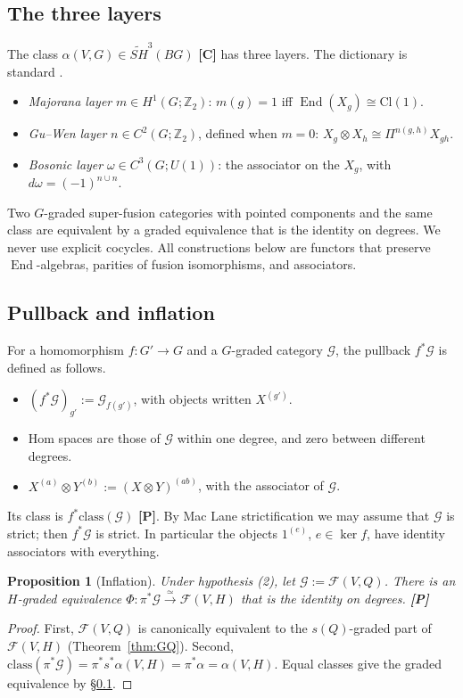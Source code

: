 \documentclass[11pt]{article}
\newtheorem{proposition}[theorem]{Proposition}
\theoremstyle{definition}
\newcommand{\cF}{\mathcal F}
\newcommand{\cG}{\mathcal G}
\newcommand{\End}{\operatorname{End}}
\newcommand{\SH}{\widetilde{SH}}
\newcommand{\Z}{\mathbb Z}
\newcommand{\st}[1]{\textbf{[#1]}}
\begin{document}
\subsection{The three layers}\label{ssec:layers}
The class $\alpha(V,G)\in\SH^3(BG)$ \cite[Thm~4.2]{GJF} \st{C} has three layers. The
dictionary is standard \cite{GJF,BGK}.
\begin{itemize}[nosep]
\item \emph{Majorana layer} $m\in H^1(G;\Z_2)$: $m(g)=1$ iff $\End(X_g)\cong\mathrm{Cl}(1)$.
\item \emph{Gu--Wen layer} $n\in C^2(G;\Z_2)$, defined when $m=0$:
$X_g\otimes X_h\cong\Pi^{n(g,h)}X_{gh}$.
\item \emph{Bosonic layer} $\omega\in C^3(G;U(1))$: the associator on the $X_g$, with
$d\omega=(-1)^{n\cup n}$.
\end{itemize}
Two $G$-graded super-fusion categories with pointed components and the same class are
equivalent by a graded equivalence that is the identity on degrees. We never use explicit
cocycles. All constructions below are functors that preserve $\End$-algebras, parities of fusion
isomorphisms, and associators.

\subsection{Pullback and inflation}\label{ssec:inflation}
For a homomorphism $f:G'\to G$ and a $G$-graded category $\cG$, the pullback $f^*\cG$ is defined
as follows.
\begin{itemize}[nosep]
\item $(f^*\cG)_{g'}:=\cG_{f(g')}$, with objects written $X^{(g')}$.
\item Hom spaces are those of $\cG$ within one degree, and zero between different degrees.
\item $X^{(a)}\otimes Y^{(b)}:=(X\otimes Y)^{(ab)}$, with the associator of $\cG$.
\end{itemize}
Its class is $f^*\mathrm{class}(\cG)$ \st{P}. By Mac Lane strictification we may assume that
$\cG$ is strict; then $f^*\cG$ is strict. In particular the objects $1^{(e)}$, $e\in\ker f$, have
identity associators with everything.

\begin{proposition}[Inflation]\label{prop:inflation}
Under hypothesis (2), let $\cG:=\cF(V,Q)$. There is an $H$-graded equivalence
$\Phi:\pi^*\cG\xrightarrow{\simeq}\cF(V,H)$ that is the identity on degrees. \st{P}
\end{proposition}
\begin{proof}
First, $\cF(V,Q)$ is canonically equivalent to the $s(Q)$-graded part of $\cF(V,H)$ (Theorem~\ref{thm:GQ}). Second,
$\mathrm{class}(\pi^*\cG)=\pi^*s^*\alpha(V,H)=\pi^*\alpha=\alpha(V,H)$. Equal classes give the
graded equivalence by \S\ref{ssec:layers}.
\end{proof}
\end{document}
